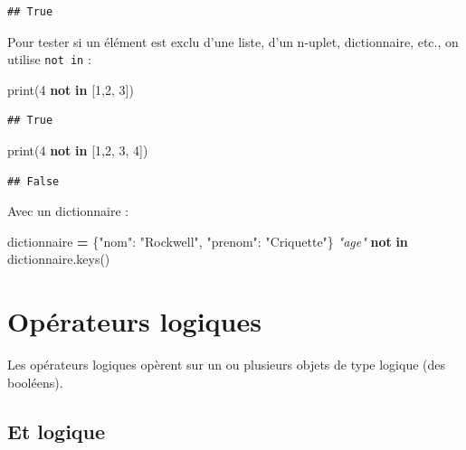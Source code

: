 \documentclass[12pt,]{book}
\newenvironment{Shaded}{\begin{snugshade}}{\end{snugshade}}
\newcommand{\KeywordTok}[1]{\textcolor[rgb]{0.13,0.29,0.53}{\textbf{#1}}}
\newcommand{\DecValTok}[1]{\textcolor[rgb]{0.00,0.00,0.81}{#1}}
\newcommand{\StringTok}[1]{\textcolor[rgb]{0.31,0.60,0.02}{#1}}
\newcommand{\CommentTok}[1]{\textcolor[rgb]{0.56,0.35,0.01}{\textit{#1}}}
\newcommand{\OperatorTok}[1]{\textcolor[rgb]{0.81,0.36,0.00}{\textbf{#1}}}
\newcommand{\BuiltInTok}[1]{#1}
\newcommand{\NormalTok}[1]{#1}
\numberwithin{equation}{section}
\numberwithin{countremarque}{section}
\begin{document}
\begin{lstlisting}
## True
\end{lstlisting}

Pour tester si un élément est exclu d'une liste, d'un n-uplet,
dictionnaire, etc., on utilise \texttt{not\ in} :

\begin{Shaded}
\begin{Highlighting}[]
\BuiltInTok{print}\NormalTok{(}\DecValTok{4} \KeywordTok{not} \KeywordTok{in}\NormalTok{ [}\DecValTok{1}\NormalTok{,}\DecValTok{2}\NormalTok{, }\DecValTok{3}\NormalTok{])}
\end{Highlighting}
\end{Shaded}

\begin{lstlisting}
## True
\end{lstlisting}

\begin{Shaded}
\begin{Highlighting}[]
\BuiltInTok{print}\NormalTok{(}\DecValTok{4} \KeywordTok{not} \KeywordTok{in}\NormalTok{ [}\DecValTok{1}\NormalTok{,}\DecValTok{2}\NormalTok{, }\DecValTok{3}\NormalTok{, }\DecValTok{4}\NormalTok{])}
\end{Highlighting}
\end{Shaded}

\begin{lstlisting}
## False
\end{lstlisting}

Avec un dictionnaire :

\begin{Shaded}
\begin{Highlighting}[]
\NormalTok{dictionnaire }\OperatorTok{=}\NormalTok{ \{}\StringTok{"nom"}\NormalTok{: }\StringTok{"Rockwell"}\NormalTok{, }\StringTok{"prenom"}\NormalTok{: }\StringTok{"Criquette"}\NormalTok{\}}
\CommentTok{"age"} \KeywordTok{not} \KeywordTok{in}\NormalTok{ dictionnaire.keys()}
\end{Highlighting}
\end{Shaded}

\section{Opérateurs logiques}\label{operateurs-logiques}

Les opérateurs logiques opèrent sur un ou plusieurs objets de type
logique (des booléens).

\subsection{Et logique}\label{et-logique}
\end{document}
